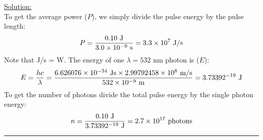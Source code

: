 \noindent
\underline{Solution:}\\

\noindent
To get the average power ($P$), we simply divide the pulse energy by the pulse length:
$$P = \frac{0.10\textnormal{ J}}{3.0\times 10^{-9}\textnormal{ s}} = 3.3\times 10^7\textnormal{ J/s}$$
Note that J/s = W. The energy of one $\lambda = 532$ nm photon is ($E$):
$$E = \frac{hc}{\lambda} = \frac{6.626076\times 10^{-34}\textnormal{ Js}\times 2.99792458\times 10^8\textnormal{ m/s}}{532 \times 10^{-9}\textnormal{ m}} = 3.73392\time 10^{-19}\textnormal{ J}$$
To get the number of photons divide the total pulse energy by the single photon energy:
$$n = \frac{0.10\textnormal{ J}}{3.73392\time 10^{-19}\textnormal{ J}} = 2.7\times 10^{17}\textnormal{ photons}$$
\hrule\vspace{0.5cm}



